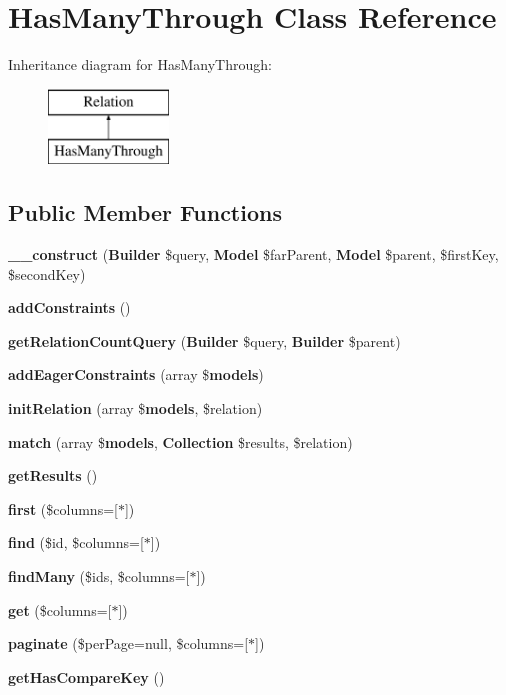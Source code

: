 \section{Has\+Many\+Through Class Reference}
\label{class_illuminate_1_1_database_1_1_eloquent_1_1_relations_1_1_has_many_through}
Inheritance diagram for Has\+Many\+Through\+:\begin{figure}[H]
\begin{center}
\leavevmode
\includegraphics[height=2.000000cm]{class_illuminate_1_1_database_1_1_eloquent_1_1_relations_1_1_has_many_through}
\end{center}
\end{figure}
\subsection*{Public Member Functions}
\begin{DoxyCompactItemize}
\item 
{\bf \+\_\+\+\_\+construct} ({\bf Builder} \$query, {\bf Model} \$far\+Parent, {\bf Model} \$parent, \$first\+Key, \$second\+Key)
\item 
{\bf add\+Constraints} ()
\item 
{\bf get\+Relation\+Count\+Query} ({\bf Builder} \$query, {\bf Builder} \$parent)
\item 
{\bf add\+Eager\+Constraints} (array \${\bf models})
\item 
{\bf init\+Relation} (array \${\bf models}, \$relation)
\item 
{\bf match} (array \${\bf models}, {\bf Collection} \$results, \$relation)
\item 
{\bf get\+Results} ()
\item 
{\bf first} (\$columns=[\textquotesingle{}$\ast$\textquotesingle{}])
\item 
{\bf find} (\$id, \$columns=[\textquotesingle{}$\ast$\textquotesingle{}])
\item 
{\bf find\+Many} (\$ids, \$columns=[\textquotesingle{}$\ast$\textquotesingle{}])
\item 
{\bf get} (\$columns=[\textquotesingle{}$\ast$\textquotesingle{}])
\item 
{\bf paginate} (\$per\+Page=null, \$columns=[\textquotesingle{}$\ast$\textquotesingle{}])
\item 
{\bf get\+Has\+Compare\+Key} ()
\end{DoxyCompactItemize}
